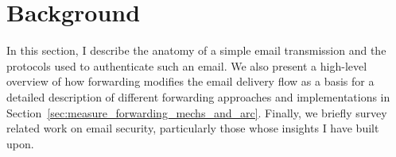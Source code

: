 
\section{Background}
\label{sec:background}

In this section, I describe the anatomy of a simple email
transmission and the protocols used to authenticate such an email.
We also present a high-level overview of how forwarding modifies the
email delivery flow as a basis for a detailed description of
different forwarding approaches and implementations in
Section~\ref{sec:measure_forwarding_mechs_and_arc}.  Finally, we
briefly survey related work on email security, particularly
those whose insights I have built upon.

